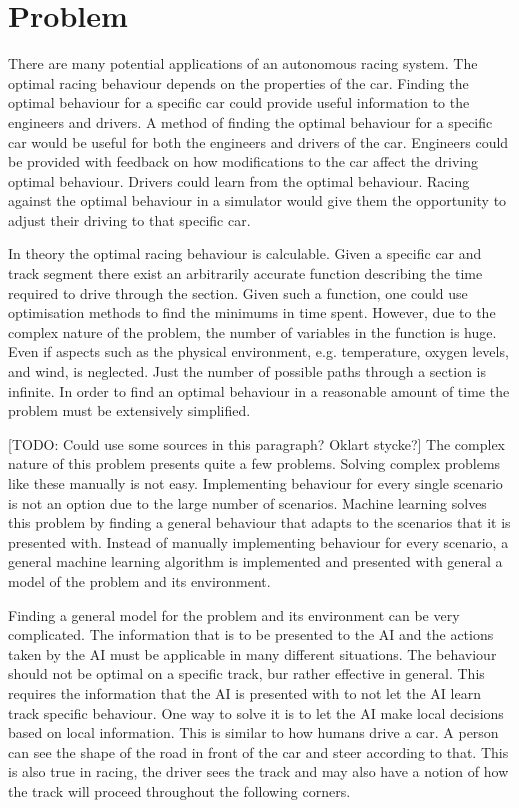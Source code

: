 \section{Problem}
There are many potential applications of an autonomous racing system. The optimal racing behaviour depends on the properties of the car. Finding the optimal behaviour for a specific car could provide useful information to the engineers and drivers. A method of finding the optimal behaviour for a specific car would be useful for both the engineers and drivers of the car. Engineers could be provided with feedback on how modifications to the car affect the driving optimal behaviour. Drivers could learn from the optimal behaviour. Racing against the optimal behaviour in a simulator would give them the opportunity to adjust their driving to that specific car.

In theory the optimal racing behaviour is calculable. Given a specific car and track segment there exist an arbitrarily accurate function describing the time required to drive through the section. Given such a function, one could use optimisation methods to find the minimums in time spent. However, due to the complex nature of the problem, the number of variables in the function is huge. Even if aspects such as the physical environment, e.g. temperature, oxygen levels, and wind, is neglected. Just the number of possible paths through a section is infinite. In order to find an optimal behaviour in a reasonable amount of time the problem must be extensively simplified.

[TODO: Could use some sources in this paragraph? Oklart stycke?]
The complex nature of this problem presents quite a few problems. Solving complex problems like these manually is not easy. Implementing behaviour for every single scenario is not an option due to the large number of scenarios. Machine learning solves this problem by finding a general behaviour that adapts to the scenarios that it is presented with. Instead of manually implementing behaviour for every scenario, a general machine learning algorithm is implemented and presented with general a model of the problem and its environment.

Finding a general model for the problem and its environment can be very complicated. The information that is to be presented to the AI and the actions taken by the AI must be applicable in many different situations. The behaviour should not be optimal on a specific track, bur rather effective in general. This requires the information that the AI is presented with to not let the AI learn track specific behaviour. One way to solve it is to let the AI make local decisions based on local information. This is similar to how humans drive a car. A person can see the shape of the road in front of the car and steer according to that. This is also true in racing, the driver sees the track and may also have a notion of how the track will proceed throughout the following corners.

